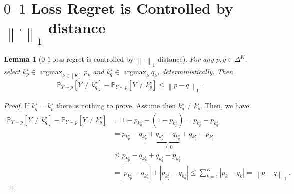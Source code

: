 \documentclass[11pt,oneside,a4paper]{article}
\newcommand{\Pb}{\mathbb{P}}
\newcommand{\lsb}[1]{\left[#1\right]}
\newcommand{\labs}[1]{\left\lvert#1\right\rvert}
\newcommand{\lno}[1]{\left\lVert#1\right\rVert}
\DeclareMathOperator*{\argmax}{argmax}
\theoremstyle{plain}
\newtheorem{lemma}[theorem]{Lemma}
\theoremstyle{definition}
\theoremstyle{remark}
\newcommand{\simplex}[1]{\Delta^{#1}}
\begin{document}
\section[0--1 Loss Regret is Controlled by L1 Distance]{$0$--$1$ Loss Regret is Controlled by $\lno{\cdot}_1$ distance}
\label{app:0-1}
\begin{lemma}[$0$-$1$ loss regret is controlled by $\lno{\cdot}_1$ distance]
\label{lem:01_from_l1}
For any $p,q\in\simplex{K}$, select $k^\star_p\in\argmax_{k \in [K]} p_k$ and $k^\star_q \in\argmax_k q_k$, deterministically.
Then
\begin{align*}
    \Pb_{Y \sim p}\lsb{Y \neq k^\star_q}
    -
    \Pb_{Y \sim p}\lsb{Y \neq k^\star_p}
\le
    \lno{p-q}_1\;.
\end{align*}
\end{lemma}
\begin{proof}
If $k^\star_q = k^\star_p$ there is nothing to prove.
Assume then $k^\star_q \neq k^\star_p$.
Then, we have
\begin{align*}
    \Pb_{Y \sim p}\lsb{Y \neq k^\star_q}
    -
    \Pb_{Y \sim p}\lsb{Y \neq k^\star_p}
&=
    1-p_{k_q^\star}-(1-p_{k_p^\star})
=
    p_{k_p^\star}-p_{k_q^\star}
\\
&=
    p_{k_p^\star}-q_{k_p^\star}
    +\underbrace{q_{k_p^\star}-q_{k_q^\star}}_{\le 0}
    +q_{k_q^\star}-p_{k_q^\star}
\\
&\le
    p_{k_p^\star}-q_{k_p^\star}
    +q_{k_q^\star}-p_{k_q^\star}
\\
&=
    \labs{p_{k_p^\star}-q_{k_p^\star}}
    +
    \labs{p_{k_q^\star}-q_{k_q^\star}}
\le
    \sum_{k=1}^K \labs{p_k-q_k}
=
    \lno{p-q}_1\;.
\end{align*}
\end{proof}
\end{document}
